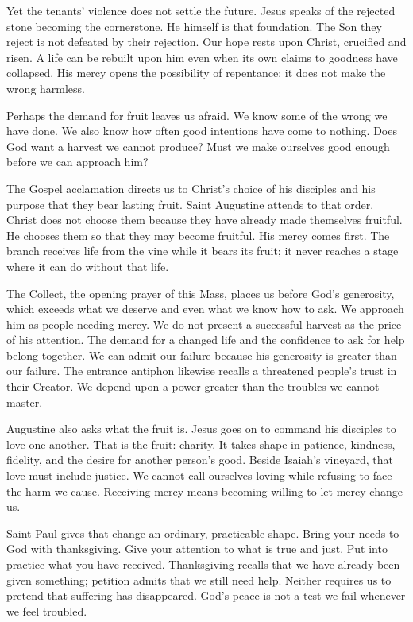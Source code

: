 Yet the tenants' violence does not settle the future. Jesus speaks of the rejected stone becoming the cornerstone. He himself is that foundation. The Son they reject is not defeated by their rejection. Our hope rests upon Christ, crucified and risen. A life can be rebuilt upon him even when its own claims to goodness have collapsed. His mercy opens the possibility of repentance; it does not make the wrong harmless.

Perhaps the demand for fruit leaves us afraid. We know some of the wrong we have done. We also know how often good intentions have come to nothing. Does God want a harvest we cannot produce? Must we make ourselves good enough before we can approach him?

The Gospel acclamation directs us to Christ's choice of his disciples and his purpose that they bear lasting fruit. Saint Augustine attends to that order. Christ does not choose them because they have already made themselves fruitful. He chooses them so that they may become fruitful. His mercy comes first. The branch receives life from the vine while it bears its fruit; it never reaches a stage where it can do without that life.

The Collect, the opening prayer of this Mass, places us before God's generosity, which exceeds what we deserve and even what we know how to ask. We approach him as people needing mercy. We do not present a successful harvest as the price of his attention. The demand for a changed life and the confidence to ask for help belong together. We can admit our failure because his generosity is greater than our failure. The entrance antiphon likewise recalls a threatened people's trust in their Creator. We depend upon a power greater than the troubles we cannot master.

Augustine also asks what the fruit is. Jesus goes on to command his disciples to love one another. That is the fruit: charity. It takes shape in patience, kindness, fidelity, and the desire for another person's good. Beside Isaiah's vineyard, that love must include justice. We cannot call ourselves loving while refusing to face the harm we cause. Receiving mercy means becoming willing to let mercy change us.

Saint Paul gives that change an ordinary, practicable shape. Bring your needs to God with thanksgiving. Give your attention to what is true and just. Put into practice what you have received. Thanksgiving recalls that we have already been given something; petition admits that we still need help. Neither requires us to pretend that suffering has disappeared. God's peace is not a test we fail whenever we feel troubled.

